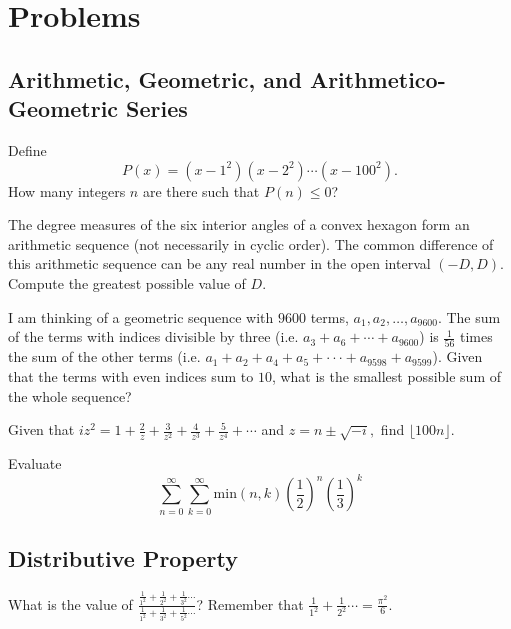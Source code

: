 \documentclass[11pt][mast]{lucky}
\begin{document}
\pagebreak

\section{Problems}



\subsection{Arithmetic, Geometric, and Arithmetico-Geometric Series}

\begin{prob}[2020 AMC 10A/17]{1}
Define $$P(x) =(x-1^2)(x-2^2)\cdots(x-100^2).$$How many integers $n$ are there such that $P(n)\leq 0$?
\end{prob}

\begin{prob}{2}
The degree measures of the six interior angles of a convex hexagon form
an arithmetic sequence (not necessarily in cyclic order). The common
difference of this arithmetic sequence can be any real number in the
open interval $(-D, D)$. Compute the greatest possible value of $D$.
\end{prob}

\begin{prob}[NEMO 2017]{2}
I am thinking of a geometric sequence with $9600$ terms, $a_1, a_2, \ldots, a_{9600}$. The sum of the terms with indices divisible by three (i.e. $a_3 + a_6 + \cdots + a_{9600}$) is $\frac{1}{56}$ times the sum of the other terms (i.e. $a_1 + a_2 + a_4 + a_5 + · · · + a_{9598} + a_{9599}$). Given that the terms with even indices sum to $10$, what is the
smallest possible sum of the whole sequence?
\end{prob}

\begin{req}{4}
Given that $ iz^2=1+\frac 2z + \frac{3}{z^2}+\frac{4}{z ^3}+\frac{5}{z^4}+\cdots$ and $z=n\pm \sqrt{-i},$ find $ \lfloor 100n \rfloor$.
\end{req}

\begin{prob}[BMT 2014]{4}
Evaluate
$$\sum_{n=0}^{\infty} \sum_{k=0}^{\infty} \text{min}(n,k)(\frac{1}{2})^{n}(\frac{1}{3})^{k}$$
\end{prob}
\subsection{Distributive Property}
\begin{prob}{2}

What is the value of $\frac{\frac{1}{1^2}+\frac{1}{2^2}+\frac{1}{3^2} \cdots}{\frac{1}{1^2}+\frac{1}{3^2}+\frac{1}{5^2}\cdots}$?
Remember that $\frac{1}{1^2}+\frac{1}{2^2}\cdots = \frac{\pi^2}{6}$.
\end{prob}
\end{document}
